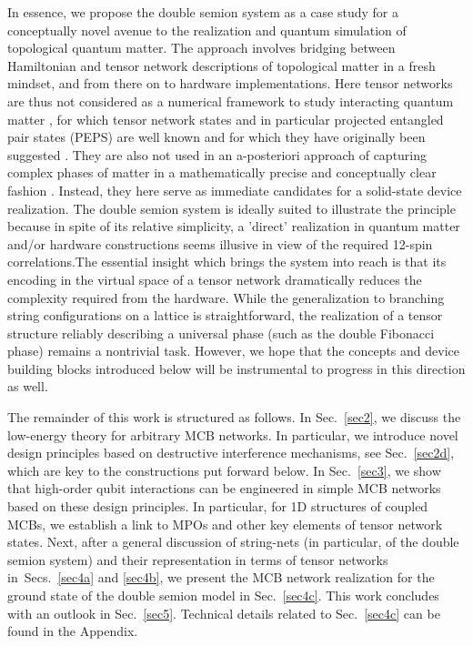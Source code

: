 \documentclass[twocolumn,floats,prx,showpacs]{revtex4-1}
\begin{document}
In essence, we propose the double semion system as a case study  for a conceptually novel avenue to the realization and quantum simulation of topological quantum matter. The approach involves bridging between Hamiltonian and tensor network descriptions of topological matter
in a fresh mindset, and from there on to hardware implementations. Here tensor networks are thus not considered as a numerical 
framework to study interacting quantum matter \cite{Orus-AnnPhys-2014,AreaReview,VerstraeteBig,Orus-AnnPhys-2014}, 
for which tensor network states and in particular projected entangled pair states (PEPS) \cite{PEPSOld, iPEPS}
are well known and for which they have originally been suggested \cite{DMRGWhite92}. They are also not used in an
a-posteriori approach of capturing complex phases of matter in a mathematically precise and conceptually clear
fashion \cite{TopologicalOrderInPEPS,PEPSTopology,ClassificationPhases,PhysRevB.81.064439,PhysRevB.95.245127,FermionicMPO,1409.2150}. 
Instead, they here serve as immediate candidates for a solid-state device realization. 
The double semion system is ideally suited to illustrate the principle because in spite of its relative simplicity, a 'direct' realization in quantum matter and/or hardware constructions seems illusive in view of the required 12-spin correlations\cite{Note1}.The essential insight which brings the system into reach is that its encoding in the virtual space of a tensor network dramatically reduces the complexity required from the hardware. While the generalization to branching string configurations on a lattice is straightforward, the realization of a tensor structure reliably describing a universal phase (such as the double Fibonacci phase) remains a nontrivial task. However, we hope that the concepts and device building blocks introduced below will be instrumental to progress in this direction as well. 
 
The remainder of this work is structured as follows. In Sec.~\ref{sec2}, we discuss the low-energy theory for arbitrary MCB networks.  In particular, we introduce novel design principles based on destructive interference mechanisms, see Sec.~\ref{sec2d}, which are key to the constructions put forward below.  In Sec.~\ref{sec3}, we show that high-order qubit interactions can be engineered in simple MCB networks based on these design principles.  In particular, for 1D structures of coupled MCBs, we establish a link to MPOs and other key elements of tensor network states.  Next, after a general discussion of string-nets (in particular, of the double semion system) and their representation in terms of tensor networks in~Secs.~\ref{sec4a} and \ref{sec4b}, we present the MCB network realization for the ground state of the double semion model in Sec.~\ref{sec4c}.  This work concludes with an outlook in Sec.~\ref{sec5}. Technical details 
related to Sec.~\ref{sec4c} can be found in the Appendix.
\end{document}
